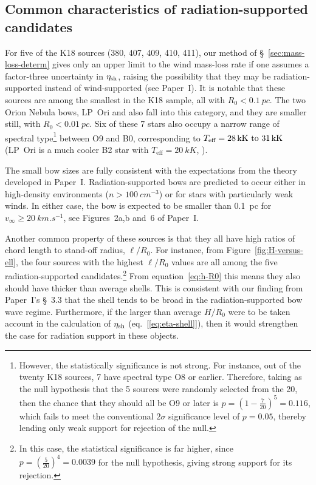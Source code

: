 \subsection{Common characteristics of radiation-supported candidates}
\label{sec:comm-prop-cand}


For five of the K18 sources (380, 407, 409, 410, 411), our method of
\S~\ref{sec:mass-loss-determ} gives only an upper limit to the wind
mass-loss rate if one assumes a factor-three uncertainty in
\(\eta_{\text{sh}}\), raising the possibility that they may be
radiation-supported instead of wind-supported (see Paper~I).  It is
notable that these sources are among the smallest in the K18 sample,
all with \(R_0 < \SI{0.1}{pc}\).  The two Orion Nebula bows, LP~Ori
and \thD{} also fall into this category, and they are smaller still,
with \(R_0 < \SI{0.01}{pc}\).  Six of these 7 stars also occupy a
narrow range of spectral type\footnote{%
  However, the statistically significance is not strong.  For
  instance, out of the twenty K18 sources, 7 have spectral type O8 or
  earlier.  Therefore, taking as the null hypothesis that the 5
  sources were randomly selected from the 20, then the chance that
  they should all be O9 or later is
  \(p = (1 - \frac{7}{20})^5 = 0.116\), which fails to meet the
  conventional \(2\sigma\) significance level of \(p = 0.05\),
  thereby lending only weak support for rejection of the null.} %
between O9 and B0, corresponding to
\(T_{\text{eff}} = \text{\SIrange{28}{31}{kK}}\) (LP~Ori is a much
cooler B2 star with \(T_{\text{eff}} = \SI{20}{kK}\),
\citealp{Petit:2008a, Alecian:2013a}).

The small bow sizes are fully consistent with the expectations from
the theory developed in Paper~I.  Radiation-supported bows are predicted
to occur either in high-density environments
(\(n > \SI{100}{cm^{-3}}\)) or for stars with particularly weak winds.
In either case, the bow is expected to be smaller than \SI{0.1}{pc}
for \(v_\infty \ge \SI{20}{km.s^{-1}}\), see Figures~2a,b and~6 of
Paper~I.\@

Another common property of these sources is that they all have high
ratios of chord length to stand-off radius, \(\ell/R_0\).  For
instance, from Figure~\ref{fig:H-versus-ell}, the four sources with
the highest \(\ell/R_0\) values are all among the five
radiation-supported candidates.\footnote{%
  In this case, the statistical significance is far higher, since
  \(p = (\frac{5}{20})^4 = 0.0039\) for the null hypothesis, giving
  strong support for its rejection.}  From equation~\eqref{eq:h-R0}
this means they also should have thicker than average shells.  This is
consistent with our finding from Paper~I's \S~3.3 that the shell tends
to be broad in the radiation-supported bow wave regime.  Furthermore,
if the larger than average \(H/R_0\) were to be taken account in the
calculation of \(\eta_{\text{sh}}\) (eq.~[\ref{eq:eta-shell}]), then it
would strengthen the case for radiation support in these objects.


